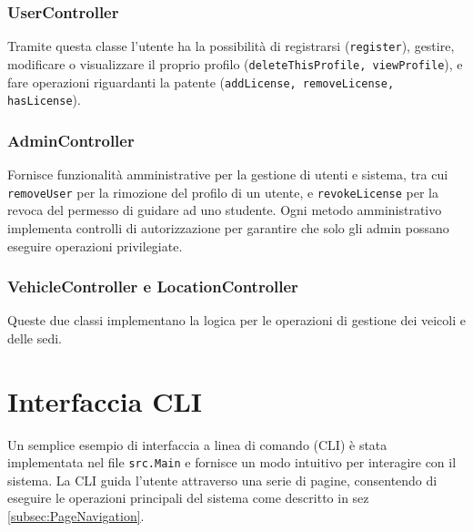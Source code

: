 \subsubsection{UserController}
Tramite questa classe l'utente ha la possibilità di registrarsi (\texttt{register}), gestire, modificare o visualizzare il proprio profilo (\texttt{deleteThisProfile, viewProfile}), e fare operazioni riguardanti la patente (\texttt{addLicense, removeLicense, hasLicense}).
\subsubsection{AdminController}
Fornisce funzionalità amministrative per la gestione di utenti e sistema, tra cui \texttt{removeUser} per la rimozione del profilo di un utente, e \texttt{revokeLicense} per la revoca del permesso di guidare ad uno studente.
Ogni metodo amministrativo implementa controlli di autorizzazione per garantire che solo gli admin possano eseguire operazioni privilegiate.
\subsubsection{VehicleController e LocationController}
Queste due classi implementano la logica per le operazioni di gestione dei veicoli e delle sedi.

\section{Interfaccia CLI}
Un semplice esempio di interfaccia a linea di comando (CLI) è stata implementata nel file \texttt{src.Main} e fornisce un modo intuitivo per interagire con il sistema. La CLI guida l'utente attraverso una serie di pagine, consentendo di eseguire le operazioni principali del sistema come descritto in sez \ref{subsec:PageNavigation}.\\

